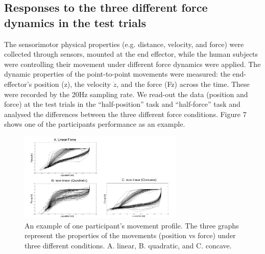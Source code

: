 \subsection{Responses to the three different force dynamics in the test trials}
The sensorimotor physical properties (e.g. distance, velocity, and force) were collected through sensors, mounted at the end effector, while the human subjects were controlling their movement under different force dynamics were applied. The dynamic properties of the point-to-point movements were measured: the end-effector’s position (z), the velocity $\dot{z}$, and the force (Fz) across the time. These were recorded by the 20Hz sampling rate. We read-out the data (position and force) at the test trials in the “half-position” task and “half-force” task and analysed the differences between the three different force conditions. Figure 7 shows one of the participants performance as an example.
%
\begin{figure}
	\centering
	\includegraphics[width=0.7\textwidth]{Chie/figs/Figure7.png}
	\caption{An example of one participant’s movement profile. The three graphs represent the properties of the movements (position vs force) under three different conditions. A. linear, B. quadratic, and C. concave.}
	\label{modelling}
\end{figure}
